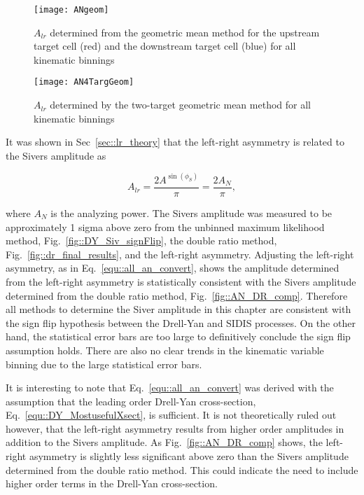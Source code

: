 \begin{figure}[h!t]
  \begin{center}
    \texttt{[image: ANgeom]}
    \caption{$A_{lr}$ determined from the geometric mean method for the upstream
      target cell (red) and the downstream target cell (blue) for all kinematic
      binnings}
    \label{fig::ANgeom}
  \end{center}
\end{figure}

\begin{figure}[h!t]
  \begin{center}
    \texttt{[image: AN4TargGeom]}
    \caption{$A_{lr}$ determined by the two-target geometric mean method
      for all kinematic binnings}
    \label{fig::AN4TargGeom}
  \end{center}
\end{figure}

It was shown in Sec~\ref{sec::lr_theory} that the left-right asymmetry is
related to the Sivers amplitude as

\begin{equation}
  \label{equ::all_an_convert}
  A_{lr} = \frac{2A^{\sin(\phi_S)}}{\pi} = \frac{2A_N}{\pi},
\end{equation}

\noindent
where $A_N$ is the analyzing power.  The Sivers amplitude was measured to be
approximately 1 sigma above zero from the unbinned maximum likelihood method,
Fig.~\ref{fig::DY_Siv_signFlip}, the double ratio method,
Fig.~\ref{fig::dr_final_results}, and the left-right asymmetry.  Adjusting the
left-right asymmetry, as in Eq.~\ref{equ::all_an_convert}, shows the amplitude
determined from the left-right asymmetry is statistically consistent with the
Sivers amplitude determined from the double ratio method,
Fig.~\ref{fig::AN_DR_comp}.  Therefore all methods to determine the Siver
amplitude in this chapter are consistent with the sign flip hypothesis between
the Drell-Yan and SIDIS processes.  On the other hand, the statistical error
bars are too large to definitively conclude the sign flip assumption holds.
There are also no clear trends in the kinematic variable binning due to the
large statistical error bars.

It is interesting to note that Eq.~\ref{equ::all_an_convert} was derived with
the assumption that the leading order Drell-Yan cross-section,
Eq.~\ref{equ::DY_MostusefulXsect}, is sufficient.  It is not theoretically ruled
out however, that the left-right asymmetry results from higher order amplitudes
in addition to the Sivers amplitude.  As Fig.~\ref{fig::AN_DR_comp} shows, the
left-right asymmetry is slightly less significant above zero than the Sivers
amplitude determined from the double ratio method.  This could indicate the need
to include higher order terms in the Drell-Yan cross-section.

